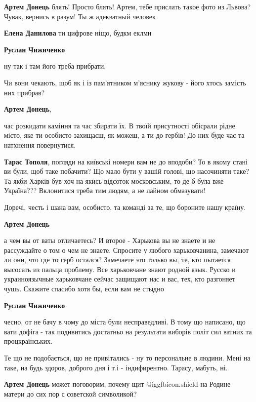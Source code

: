 \begin{itemize}
\begin{itemize}
\textbf{Артем Донець} блять! Просто блять! Артем, тебе прислать такое фото из Львова? Чувак, вернись в разум! Ты ж адекватный человек

\textbf{Елена Данилова} ти цифрове ніщо, будкм еклмн

\textbf{Руслан Чижиченко} 

ну так і там його треба прибрати.

Чи вони чекають, щоб як і із пам'ятником м'яснику жукову - його хтось замість
них прибрав?

\textbf{Артем Донець}, 

час розкидати каміння та час збирати їх. В твоїй присутності обісрали рідне
місто, яке ти особисто захищаєш, як можеш, а ти до гербів! До них буде час та
натхнення повернутися.

\textbf{Тарас Тополя}, погляди на київські номери вам не до вподоби? То в якому стані ви
були, щоб таке побачити? Що мало бути у вашій голові, що насочиняти таке? Та
якби Харків був хоч на якись відсоток московським, то де б була вже Україна???
Вклонитися треба тим людям, а не лайном обмазувати!

Доречі, честь і шана вам, особисто, та команді за те, що бороните нашу країну.

\textbf{Артем Донець} 

а чем вы от ваты отличаетесь? И второе - Харькова вы не знаете и не рассуждайте
о том о чем не знаете. Спросите у любого харьковчанина, замечают ли они, что
где то герб остался? Замечаете это только вы, те, кто пытается высосать из
пальца проблему. Все харьковчане знают родной язык. Русско и украиноязычные
харьковчане сейчас защищают нас и вас, тех, кто разгоняет чушь. Скажите спасибо
хотя бы, если вам не стыдно

\textbf{Руслан Чижиченко} 

чесно, от не бачу в чому до міста були несправедливі. В тому що написано, що
вати дофіга - так подивитись достатньо на результати виборів політ сил ватних
та процкраїнських.

Те що не подобається, що не привітались - ну то персональне в людини. Мені на
таке, на будь здоров, доброго дня і т.і - індифирентно. Тарасу, мабуть, ні.

\textbf{Артем Донець} может поговорим, почему щит  @igg{fbicon.shield}  на Родине матери до сих пор с советской символикой?


\end{itemize}
\end{itemize}
